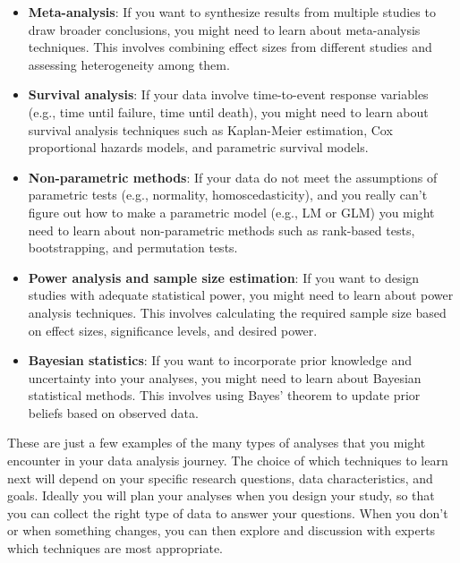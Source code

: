 \documentclass[
  letterpaper,
  8pt,
  a4paper]{book}
\begin{document}
\begin{itemize}
  data based on patterns, you might need to learn about machine learning
  techniques such as decision trees, random forests, support vector
  machines, and neural networks. These methods can handle large datasets
  and complex relationships but may sacrifice some interpretability.
\item
  \textbf{Meta-analysis}: If you want to synthesize results from
  multiple studies to draw broader conclusions, you might need to learn
  about meta-analysis techniques. This involves combining effect sizes
  from different studies and assessing heterogeneity among them.
\item
  \textbf{Survival analysis}: If your data involve time-to-event
  response variables (e.g., time until failure, time until death), you
  might need to learn about survival analysis techniques such as
  Kaplan-Meier estimation, Cox proportional hazards models, and
  parametric survival models.
\item
  \textbf{Non-parametric methods}: If your data do not meet the
  assumptions of parametric tests (e.g., normality, homoscedasticity),
  and you really can't figure out how to make a parametric model (e.g.,
  LM or GLM) you might need to learn about non-parametric methods such
  as rank-based tests, bootstrapping, and permutation tests.
\item
  \textbf{Power analysis and sample size estimation}: If you want to
  design studies with adequate statistical power, you might need to
  learn about power analysis techniques. This involves calculating the
  required sample size based on effect sizes, significance levels, and
  desired power.
\item
  \textbf{Bayesian statistics}: If you want to incorporate prior
  knowledge and uncertainty into your analyses, you might need to learn
  about Bayesian statistical methods. This involves using Bayes' theorem
  to update prior beliefs based on observed data.
\end{itemize}

These are just a few examples of the many types of analyses that you
might encounter in your data analysis journey. The choice of which
techniques to learn next will depend on your specific research
questions, data characteristics, and goals. Ideally you will plan your
analyses when you design your study, so that you can collect the right
type of data to answer your questions. When you don't or when something
changes, you can then explore and discussion with experts which
techniques are most appropriate.
\end{document}
